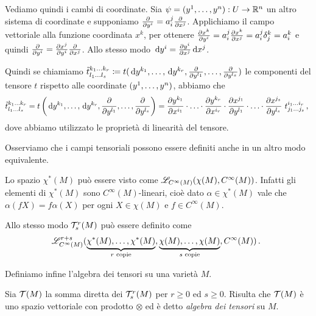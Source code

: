 Vediamo quindi i cambi di coordinate.
Sia $\psi=(y^1,\ldots, y^n): U \to \R^n$ un altro sistema di coordinate e supponiamo $\DerParz{}{y^i} = a_i^j \DerParz{}{x^j}$. Applichiamo il campo vettoriale alla funzione coordinata $x^k$, per ottenere $\DerParz{x^k}{y^i} = a_i^j \DerParz{x^k}{x^j} = a_i^j \delta_j^k = a_i^k$ e quindi $\DerParz{}{y^i} = \DerParz{x^j}{y^i} \DerParz{}{x^j}$.
Allo stesso modo $\de y^i = \DerParz{y^i}{x^j} \de x^j$.

Quindi se chiamiamo $\tilde t_{l_1\ldots l_s}^{k_1\ldots k_r} \coloneqq t(\de y^{k_1},\ldots,\de y^{k_r}, \DerParz{}{y^{l_1}},\ldots, \DerParz{}{y^{l_s}})$ le componenti del tensore $t$ rispetto alle coordinate $(\seqa yn,)$, abbiamo che
\begin{equation*}
	\tilde t_{l_1\ldots l_s}^{k_1\ldots k_r} = t\left(\de y^{k_1},\ldots,\de y^{k_r}, \DerParz{}{y^{l_1}},\ldots, \DerParz{}{y^{l_s}}\right) = \DerParz{y^{k_1}}{x^{i_1}}\cdot\ldots\cdot\DerParz{y^{k_r}}{x^{i_r}}\cdot \DerParz{x^{j_1}}{y^{l_1}}\cdot\ldots\cdot\DerParz{x^{j_s}}{y^{l_s}}\ t_{j_1\ldots j_s}^{i_1\ldots i_r} \virgola
\end{equation*}
dove abbiamo utilizzato le proprietà di linearità del tensore.



\begin{remark}
Osserviamo che i campi tensoriali possono essere definiti anche in un altro modo equivalente.

Lo spazio $\chi^*(M)$ può essere visto come $\Lin_{C^\infty(M)} (\chi(M), C^\infty(M))$. Infatti gli elementi di $\chi^*(M)$ sono $C^\infty(M)$-lineari, cioè dato $\alpha\in\chi^*(M)$ vale che $\alpha(fX) = f \alpha (X)$ per ogni $X\in\chi(M)$ e $f\in C^\infty(M)$.

Allo stesso modo $\Tau_s^r(M)$ può essere definito come
\begin{equation*}
	\Lin_{C^\infty(M)}^{r+s}(\underbrace{\chi^*(M),\ldots,\chi^*(M)}_{\text{$r$ copie}},\underbrace{\chi(M),\ldots,\chi(M)}_{\text{$s$ copie}},C^\infty(M))\punto
\end{equation*}
\end{remark}

Definiamo infine l'algebra dei tensori su una varietà $M$.
\begin{definition} 
	Sia $\Tau(M)$ la somma diretta dei $\Tau_s^r(M)$ per $r\ge 0$ ed $s\ge 0$. Risulta che $\Tau(M)$ è uno spazio vettoriale con prodotto $\otimes$ ed è detto \emph{algebra dei tensori} su $M$.
\end{definition}

